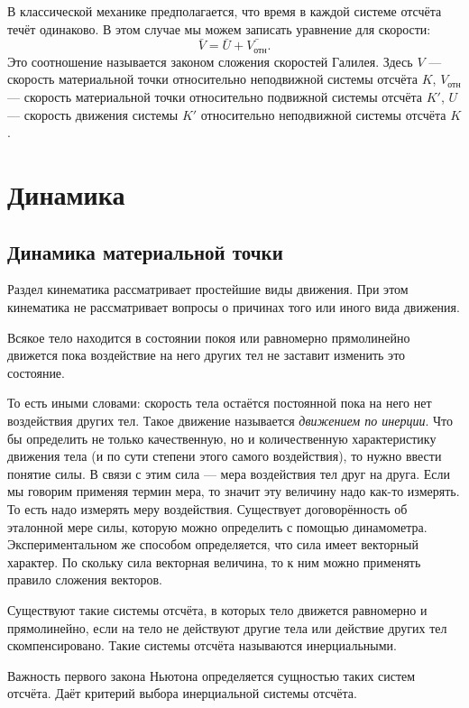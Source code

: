 В классической механике предполагается, что время в каждой системе отсчёта
течёт одинаково. В этом случае мы можем записать уравнение для скорости: \[
  \bar{V} = \bar{U} + \bar{V_\text{отн}}
.\] Это соотношение называется законом сложения скоростей Галилея. Здесь \(
V \) --- скорость материальной точки относительно неподвижной системы отсчёта
\( K \), \( V_\text{отн} \) --- скорость материальной точки относительно
подвижной системы отсчёта \( K' \), \( U \) --- скорость движения системы \(
K' \) относительно неподвижной системы отсчёта \( K \).

\chapter{Динамика}
\section{Динамика материальной точки}%

Раздел кинематика рассматривает простейшие виды движения. При этом кинематика
не рассматривает вопросы о причинах того или иного вида движения.

Всякое тело находится в состоянии покоя или равномерно прямолинейно движется
пока воздействие на него других тел не заставит изменить это состояние.

То есть иными словами: скорость тела остаётся постоянной пока на него нет
воздействия других тел. Такое движение называется \emph{движением по инерции}.
Что бы определить не только качественную, но и количественную характеристику
движения тела (и по сути степени этого самого воздействия), то нужно ввести
понятие силы. В связи с этим сила --- мера воздействия тел друг на
друга. Если мы
говорим применяя термин мера, то значит эту величину надо как-то измерять. То
есть надо измерять меру воздействия. Существует договорённость об эталонной
мере силы, которую можно определить с помощью динамометра. Экспериментальном
же способом определяется, что сила имеет векторный характер. По скольку сила
векторная величина, то к ним можно применять правило сложения векторов.

\begin{theorem}
  Существуют такие системы отсчёта, в которых тело движется равномерно и
  прямолинейно, если на тело не  действуют другие тела или действие других тел
  скомпенсировано. Такие системы отсчёта называются инерциальными.
\end{theorem}

Важность первого закона Ньютона определяется сущностью таких систем отсчёта.
Даёт критерий выбора инерциальной системы отсчёта.

